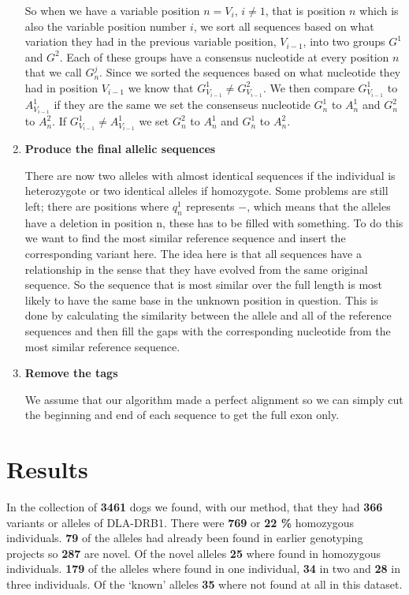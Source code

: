 \documentclass[a4paper,11pt]{kth-mag}
\begin{document}
\begin{enumerate}
	So when we have a variable position $n = V_i, \, i \neq 1$, that is position $n$ which is also the variable position number $i$, we sort all sequences based on what variation they had in the previous variable position, $V_{i-1}$, into two groups $G^1$ and $G^2$. Each of these groups have a consensus nucleotide at every position $n$ that we call $G^j_n$. Since we sorted the sequences based on what nucleotide they had in position $V_{i-1}$ we know that $G^1_{V_{i-1}} \neq G^2_{V_{i-1}}$. We then compare $G^1_{V_{i-1}}$ to $A^1_{V_{i-1}}$ if they are the same we set the consenseus nucleotide $G^1_n$ to $A^1_n$ and $G^2_n$ to $A^2_n$. If $G^1_{V_{i-1}} \neq A^1_{V_{i-1}}$ we set $G^2_n$ to $A^1_n$ and $G^1_n$ to $A^2_n$.

	\item \textbf{Produce the final allelic sequences}

	There are now two alleles with almost identical sequences if the individual is heterozygote or two identical alleles if homozygote. Some problems are still left; there are positions where $q_n^1$ represents $-$, which means that the alleles have a deletion in position n, these has to be filled with something. To do this we want to find the most similar reference sequence and insert the corresponding variant here. The idea here is that all sequences have a relationship in the sense that they have evolved from the same original sequence. So the sequence that is most similar over the full length is most likely to have the same base in the unknown position in question. This is done by calculating the similarity between the allele and all of the reference sequences and then fill the gaps with the corresponding nucleotide from the most similar reference sequence.

	\item \textbf{Remove the tags}

	We assume that our algorithm made a perfect alignment so we can simply cut the beginning and end of each sequence to get the full exon only.


\end{enumerate}

\chapter{Results}


In the collection of \textbf{3461} dogs we found, with our method, that they had \textbf{366} variants or alleles of DLA-DRB1. There were \textbf{769} or \textbf{22 \%} homozygous individuals. \textbf{79} of the alleles had already been found in earlier genotyping projects so \textbf{287} are novel. Of the novel alleles \textbf{25} where found in homozygous individuals. \textbf{179} of the alleles where found in one individual, \textbf{34} in two and \textbf{28} in three individuals. Of the `known' alleles \textbf{35} where not found at all in this dataset. 
\end{document}
